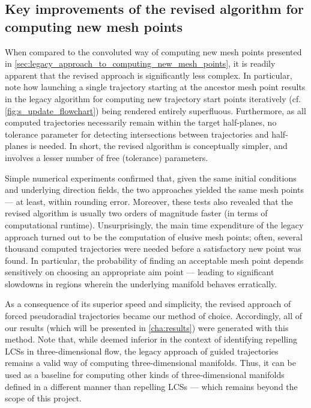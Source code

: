 \subsection{Key improvements of the revised algorithm for computing new mesh
points}
\label{sub:key_improvements_of_the_revised_algorithm_for_computing_new_mesh%
_points}

When compared to the convoluted way of computing new mesh points presented in
\cref{sec:legacy_approach_to_computing_new_mesh_points}, it is readily apparent
that the revised approach is significantly less complex. In particular, note
how launching a single trajectory starting at the ancestor mesh point results
in the legacy algorithm for computing new trajectory start points iteratively
(cf. \cref{fig:s_update_flowchart}) being rendered entirely superfluous.
Furthermore, as all computed trajectories necessarily remain within the target
half-planes, no tolerance parameter for detecting intersections between
trajectories and half-planes is needed. In short, the revised algorithm is
conceptually simpler, and involves a lesser number of free (tolerance)
parameters.

Simple numerical experiments confirmed that, given the same initial
conditions and underlying direction fields, the two approaches yielded the
same mesh points --- at least, within rounding error. Moreover, these tests
also revealed that the revised algorithm is usually two orders of
magnitude faster (in terms of computational runtime). Unsurprisingly, the
main time expenditure of the legacy approach turned out to be the computation
of elusive mesh points; often, several thousand computed trajectories were
needed before a satisfactory new point was found. In particular, the
probability of finding an acceptable mesh point depends sensitively on
choosing an appropriate aim point --- leading to significant slowdowns in
regions wherein the underlying manifold behaves erratically.

As a consequence of its superior speed and simplicity, the revised approach of
forced pseudoradial trajectories became our method of choice. Accordingly, all
of our results (which will be presented in \cref{cha:results}) were generated
with this method. Note that, while deemed inferior in the context of
identifying repelling LCSs in three-dimensional flow, the legacy approach of
guided trajectories remains a valid way of computing three-dimensional
manifolds. Thus, it can be used as a baseline for computing other kinds of
three-dimensional manifolds defined in a different manner than repelling LCSs
--- which remains beyond the scope of this project.
